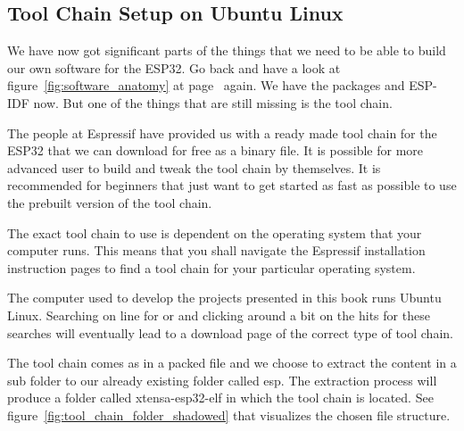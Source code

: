 \documentclass{tufte-book}
\begin{document}
\subsection{Tool Chain Setup on Ubuntu Linux}


We have now got significant parts of the things that we need to be able to build our own software for the ESP32. Go back and have a look at figure~\ref{fig:software_anatomy} at page~\pageref{fig:software_anatomy} again. We have the packages and ESP-IDF now. But one of the things that are still missing is the tool chain.

The people at Espressif have provided us with a ready made tool chain for the ESP32 that we can download for free as a binary file. It is possible for more advanced user to build and tweak the tool chain by themselves. It is recommended for beginners that just want to get started as fast as possible to use the prebuilt version of the tool chain.

The exact tool chain to use is dependent on the operating system that your computer runs. This means that you shall navigate the Espressif installation instruction pages to find a tool chain for your particular operating system.


The computer used to develop the projects presented in this book runs Ubuntu Linux. Searching on line for  or  and clicking around a bit on the hits for these searches will eventually lead to a download page of the correct type of tool chain.

The tool chain comes as in a packed file and we choose to extract the content in a sub folder to our already existing folder called esp. The extraction process will produce a folder called xtensa-esp32-elf in which the tool chain is located. See figure~\ref{fig:tool_chain_folder_shadowed} that visualizes the chosen file structure.
\end{document}
